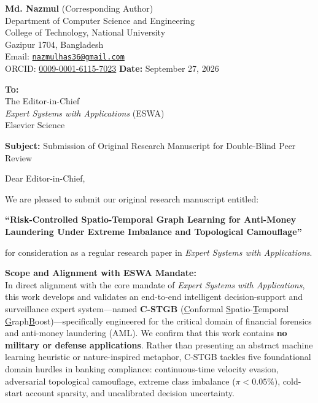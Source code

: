 \documentclass[11pt,a4paper]{article}
\begin{document}
\pagestyle{empty}

\noindent
\textbf{Md. Nazmul} (Corresponding Author) \\
Department of Computer Science and Engineering \\
College of Technology, National University \\
Gazipur 1704, Bangladesh \\
Email: \href{mailto:nazmulhas36@gmail.com}{\texttt{nazmulhas36@gmail.com}} \\
ORCID: \href{https://orcid.org/0009-0001-6115-7023}{0009-0001-6115-7023} \hfill \textbf{Date:} September 27, 2026

\vspace{1.2em}
\noindent
\textbf{To:} \\
The Editor-in-Chief \\
\textit{Expert Systems with Applications} (ESWA) \\
Elsevier Science

\vspace{1.2em}
\noindent
\textbf{Subject:} Submission of Original Research Manuscript for Double-Blind Peer Review

\vspace{0.8em}
\noindent
Dear Editor-in-Chief,

\vspace{0.6em}
\noindent
We are pleased to submit our original research manuscript entitled:

\begin{center}
\textbf{``Risk-Controlled Spatio-Temporal Graph Learning for Anti-Money Laundering Under Extreme Imbalance and Topological Camouflage''}
\end{center}

\noindent
for consideration as a regular research paper in \textit{Expert Systems with Applications}.

\vspace{0.6em}
\noindent
\textbf{Scope and Alignment with ESWA Mandate:}\\
In direct alignment with the core mandate of \textit{Expert Systems with Applications}, this work develops and validates an end-to-end intelligent decision-support and surveillance expert system---named \textbf{C-STGB} (\underline{C}onformal \underline{S}patio-\underline{T}emporal \underline{G}raph\underline{B}oost)---specifically engineered for the critical domain of financial forensics and anti-money laundering (AML). We confirm that this work contains \textbf{no military or defense applications}. Rather than presenting an abstract machine learning heuristic or nature-inspired metaphor, C-STGB tackles five foundational domain hurdles in banking compliance: continuous-time velocity evasion, adversarial topological camouflage, extreme class imbalance ($\pi < 0.05\%$), cold-start account sparsity, and uncalibrated decision uncertainty.
\end{document}
